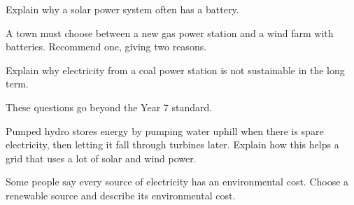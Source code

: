 \task Explain why a solar power system often has a battery.
\answerbox{5cm}

\task A town must choose between a new gas power station and a wind farm with batteries. Recommend one, giving two reasons.
\answerbox{5cm}

\task Explain why electricity from a coal power station is not sustainable in the long term.
\answerbox{5cm}

\label{ext:5}

\begin{yr8box}
These questions go beyond the Year 7 standard.

\medskip
\begin{keepext}
\exttask Pumped hydro stores energy by pumping water uphill when there is spare electricity, then letting it fall through turbines later. Explain how this helps a grid that uses a lot of solar and wind power.
\answerbox{5cm}
\end{keepext}
\begin{keepext}
\exttask Some people say every source of electricity has an environmental cost. Choose a renewable source and describe its environmental cost.
\answerbox{5cm}
\end{keepext}
\end{yr8box}
